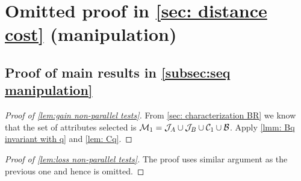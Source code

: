 \section{Omitted proof in \cref{sec: distance cost} (manipulation)}\label{appendix: distance cost}



\subsection{Proof of main results in \cref{subsec:seq manipulation}}


\begin{proof}[Proof of \cref{lem:gain non-parallel tests}]
   From \cref{sec: characterization BR} we know that the set of attributes selected is $\mathcal{M}_1=\mathcal{J}_A \cup \mathcal{J}_B \cup\mathcal{C}_1 \cup \mathcal{B} $.
   Apply \cref{lmm: Bq invariant with q} and \cref{lem: Cq}. 
\end{proof}

\begin{proof}[Proof of \cref{lem:loss non-parallel tests}]
    The proof uses similar argument as the previous one and hence is omitted.
\end{proof}

